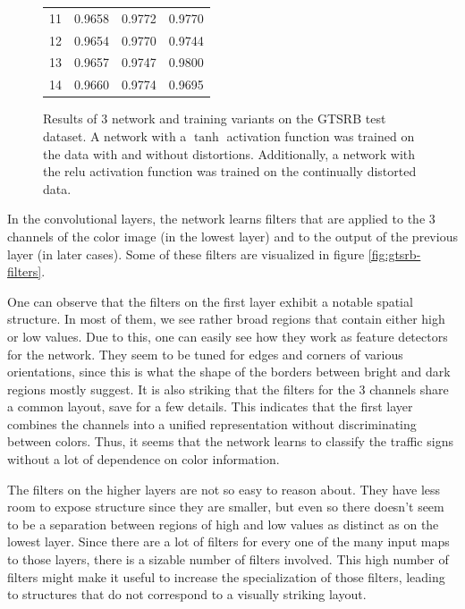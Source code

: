 \documentclass[11pt, a4paper]{article}
\begin{document}
\begin{figure}[h!]
\begin{tabular}{|r|rrr|}
		11 & 0.9658 & 0.9772 & 0.9770 \\
		12 & 0.9654 & 0.9770 & 0.9744 \\
		13 & 0.9657 & 0.9747 & 0.9800 \\
		14 & 0.9660 & 0.9774 & 0.9695 \\
		\hline
	\end{tabular}
	\caption{Results of 3 network and training variants on the GTSRB test dataset. A network with a $\tanh$ activation function was trained on the data with and without distortions. Additionally, a network with the relu activation function was trained on the continually distorted data.}
	\label{fig:gtsrb-results}
\end{figure}

In the convolutional layers, the network learns filters that are applied to the 3 channels of the color image (in the lowest layer) and to the output of the previous layer (in later cases). Some of these filters are visualized in figure \ref{fig:gtsrb-filters}.

One can observe that the filters on the first layer exhibit a notable spatial structure. In most of them, we see rather broad regions that contain either high or low values. Due to this, one can easily see how they work as feature detectors for the network. They seem to be tuned for edges and corners of various orientations, since this is what the shape of the borders between bright and dark regions mostly suggest. It is also striking that the filters for the 3 channels share a common layout, save for a few details. This indicates that the first layer combines the channels into a unified representation without discriminating between colors. Thus, it seems that the network learns to classify the traffic signs without a lot of dependence on color information.

The filters on the higher layers are not so easy to reason about. They have less room to expose structure since they are smaller, but even so there doesn't seem to be a separation between regions of high and low values as distinct as on the lowest layer. Since there are a lot of filters for every one of the many input maps to those layers, there is a sizable number of filters involved. This high number of filters might make it useful to increase the specialization of those filters, leading to structures that do not correspond to a visually striking layout.
\end{document}
